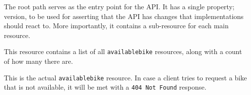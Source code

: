 The root path serves as the entry point for the API.
It has a single property; version, to be used for asserting that the API has changes that implementations should react to.
More importantly, it contains a sub-resource for each main resource.

\noindent\hrulefill

This resource contains a list of all \texttt{availablebike} resources, along with a count of how many there are.

\noindent\hrulefill

This is the actual \texttt{availablebike} resource.
In case a client tries to request a bike that is not available, it will be met with a \texttt{404 Not Found} response.

\noindent\hrulefill


\noindent\hrulefill


\noindent\hrulefill

